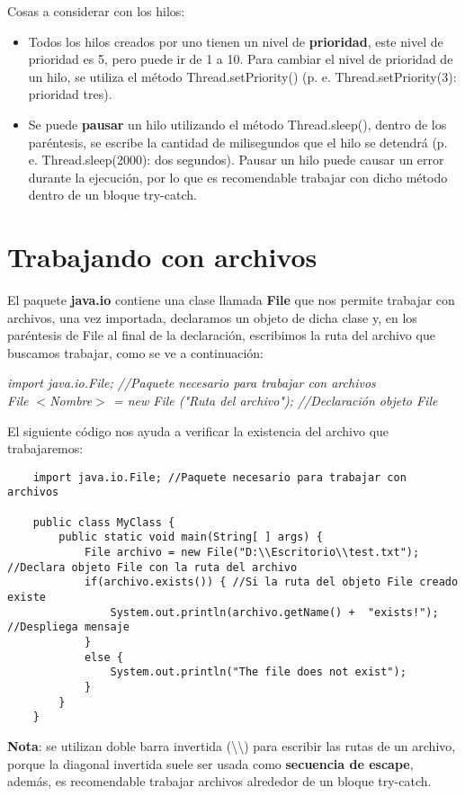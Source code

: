 Cosas a considerar con los hilos:
\begin{itemize}
    \item Todos los hilos creados por uno tienen un nivel de \textbf{prioridad}, este nivel de prioridad es 5, pero puede ir de 1 a 10. Para cambiar el nivel de prioridad de un hilo, se utiliza el método Thread.setPriority() (p. e. Thread.setPriority(3): prioridad tres).
    \item Se puede \textbf{pausar} un hilo utilizando el método Thread.sleep(), dentro de los paréntesis, se escribe la cantidad de milisegundos que el hilo se detendrá (p. e. Thread.sleep(2000): dos segundos). Pausar un hilo puede causar un error durante la ejecución, por lo que es recomendable trabajar con dicho método dentro de un bloque try-catch.
\end{itemize}



\section{Trabajando con archivos}
El paquete \textbf{java.io} contiene una clase llamada \textbf{File} que nos permite trabajar con archivos, una vez importada, declaramos un objeto de dicha clase y, en los paréntesis de File al final de la declaración, escribimos la ruta del archivo que buscamos trabajar, como se ve a continuación:
\begin{center}\textit{import java.io.File; //Paquete necesario para trabajar con archivos\\File $<$Nombre$>$ = new File ("Ruta del archivo"); //Declaración objeto File}\end{center}
El siguiente código nos ayuda a verificar la existencia del archivo que trabajaremos:
\begin{lstlisting}
    import java.io.File; //Paquete necesario para trabajar con archivos

    public class MyClass {
        public static void main(String[ ] args) {
            File archivo = new File("D:\\Escritorio\\test.txt"); //Declara objeto File con la ruta del archivo
            if(archivo.exists()) { //Si la ruta del objeto File creado existe
                System.out.println(archivo.getName() +  "exists!"); //Despliega mensaje
            }
            else { 
                System.out.println("The file does not exist");
            }
        }
    }
\end{lstlisting}
\textbf{Nota}: se utilizan doble barra invertida (\textbackslash\textbackslash) para escribir las rutas de un archivo, porque la diagonal invertida suele ser usada como \textbf{secuencia de escape}, además, es recomendable trabajar archivos alrededor de un bloque try-catch.


